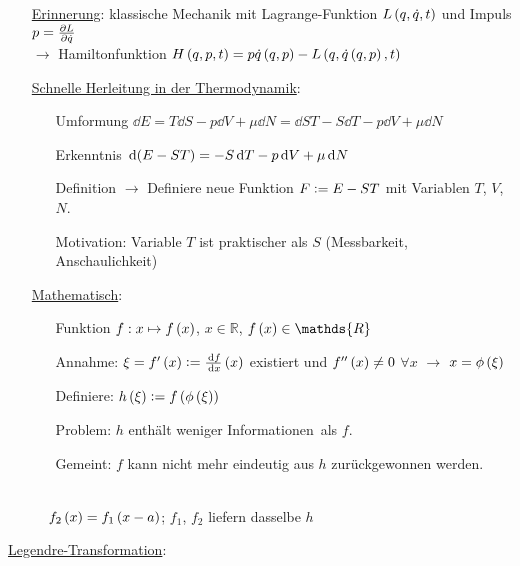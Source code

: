 \begin{itemize}[align=left]
  \item[\uline{Erinnerung}:] klassische Mechanik mit Lagrange-Funktion $L\left( q,\dot{q},t \right)$ und Impuls $p = \frac{\partial L}{\partial \dot{q}}$\\
  $\rightarrow$ Hamiltonfunktion $H\left( q,p,t \right) = p\dot{q}\left( q,p \right) - L \left( q,\dot{q}\left( q,p \right),t \right)$
  \item[\uline{Schnelle Herleitung in der Thermodynamik}:] \begin{itemize}[align=left]
    \item[Umformung]$\dd{E} = T\dd{S} -p \dd{V} + \mu\dd{N} = \dd{ST} - S\dd{T} - p\dd{V} + \mu\dd{N}$
    \item[Erkenntnis]$\,\text d{\left( E-ST \right)} = - S\,\text d{T} -p \,\text d{V} + \mu\,\text d{N}$
    \item[Definition]$\rightarrow$ Definiere neue Funktion $F\vcentcolon = E-ST$ mit Variablen $T$, $V$, $N$.
    \item[Motivation:] Variable $T$ ist praktischer als $S$ (Messbarkeit, Anschaulichkeit)
  \end{itemize}
  \item[\uline{Mathematisch}:] \begin{itemize}[align=left]
    \item[Funktion] $f: x \mapsto f\left( x \right)$, $x\in\mathds{R}$, $f\norBra{x} \in\mathds{R}$
    \item[Annahme:] $\xi = f'\left( x \right) \vcentcolon = \frac{\,\text d{f}}{\,\text d{x}}\left( x \right)$ existiert und $f''\left( x \right) \neq 0$ $\forall x$ $\rightarrow$ $x = \phi\left( \xi \right)$
    \item[Definiere:] $h\left( \xi \right) \vcentcolon = f\left( \phi\left( \xi \right) \right)$
    \item[Problem:] $h$ enthält \glqq weniger Informationen\grqq\ als $f$.
    \item[Gemeint:] $f$ kann nicht mehr eindeutig aus $h$ zurückgewonnen werden.
  \end{itemize}
\end{itemize}

\begin{figure}[H]
  \centering
  \\
  $f_2\left( x \right) = f_1\left( x-a \right)$; $f_1$, $f_2$ liefern dasselbe $h$
\end{figure}

\uline{Legendre-Transformation}:
\begin{figure}[H]
  \centering
  
\end{figure}
\setlength{\tabcolsep}{1pt}
